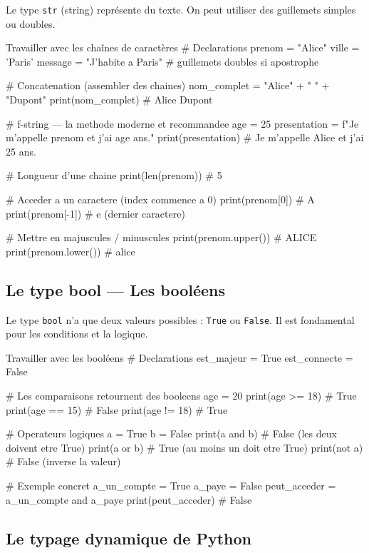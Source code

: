 \documentclass[12pt, a4paper]{article}
\begin{document}
Le type \texttt{str} (string) représente du texte. On peut utiliser des guillemets simples ou doubles.

\begin{codeblock}{Travailler avec les chaînes de caractères}
# Declarations
prenom = "Alice"
ville = 'Paris'
message = "J'habite a Paris"   # guillemets doubles si apostrophe

# Concatenation (assembler des chaines)
nom_complet = "Alice" + " " + "Dupont"
print(nom_complet)   # Alice Dupont

# f-string — la methode moderne et recommandee
age = 25
presentation = f"Je m'appelle {prenom} et j'ai {age} ans."
print(presentation)  # Je m'appelle Alice et j'ai 25 ans.

# Longueur d'une chaine
print(len(prenom))   # 5

# Acceder a un caractere (index commence a 0)
print(prenom[0])     # A
print(prenom[-1])    # e (dernier caractere)

# Mettre en majuscules / minuscules
print(prenom.upper())   # ALICE
print(prenom.lower())   # alice
\end{codeblock}

\subsection{Le type bool — Les booléens}

Le type \texttt{bool} n'a que deux valeurs possibles : \texttt{True} ou \texttt{False}. Il est fondamental pour les conditions et la logique.

\begin{codeblock}{Travailler avec les booléens}
# Declarations
est_majeur = True
est_connecte = False

# Les comparaisons retournent des booleens
age = 20
print(age >= 18)    # True
print(age == 15)    # False
print(age != 18)    # True

# Operateurs logiques
a = True
b = False
print(a and b)   # False (les deux doivent etre True)
print(a or b)    # True  (au moins un doit etre True)
print(not a)     # False (inverse la valeur)

# Exemple concret
a_un_compte = True
a_paye = False
peut_acceder = a_un_compte and a_paye
print(peut_acceder)   # False
\end{codeblock}

\subsection{Le typage dynamique de Python}
\end{document}
